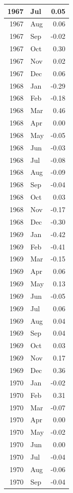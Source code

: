 \documentclass[
]{article}
\begin{document}
\begin{table}[H]
\begin{tabular}[t]{r|l|r}
\hline
1967 & Jul & 0.05\\
\hline
1967 & Aug & 0.06\\
\hline
1967 & Sep & -0.02\\
\hline
1967 & Oct & 0.30\\
\hline
1967 & Nov & 0.02\\
\hline
1967 & Dec & 0.06\\
\hline
1968 & Jan & -0.29\\
\hline
1968 & Feb & -0.18\\
\hline
1968 & Mar & 0.46\\
\hline
1968 & Apr & 0.00\\
\hline
1968 & May & -0.05\\
\hline
1968 & Jun & -0.03\\
\hline
1968 & Jul & -0.08\\
\hline
1968 & Aug & -0.09\\
\hline
1968 & Sep & -0.04\\
\hline
1968 & Oct & 0.03\\
\hline
1968 & Nov & -0.17\\
\hline
1968 & Dec & -0.30\\
\hline
1969 & Jan & -0.42\\
\hline
1969 & Feb & -0.41\\
\hline
1969 & Mar & -0.15\\
\hline
1969 & Apr & 0.06\\
\hline
1969 & May & 0.13\\
\hline
1969 & Jun & -0.05\\
\hline
1969 & Jul & 0.06\\
\hline
1969 & Aug & 0.04\\
\hline
1969 & Sep & 0.04\\
\hline
1969 & Oct & 0.03\\
\hline
1969 & Nov & 0.17\\
\hline
1969 & Dec & 0.36\\
\hline
1970 & Jan & -0.02\\
\hline
1970 & Feb & 0.31\\
\hline
1970 & Mar & -0.07\\
\hline
1970 & Apr & 0.00\\
\hline
1970 & May & -0.02\\
\hline
1970 & Jun & 0.00\\
\hline
1970 & Jul & -0.04\\
\hline
1970 & Aug & -0.06\\
\hline
1970 & Sep & -0.04\\

\end{tabular}
\end{table}
\end{document}
